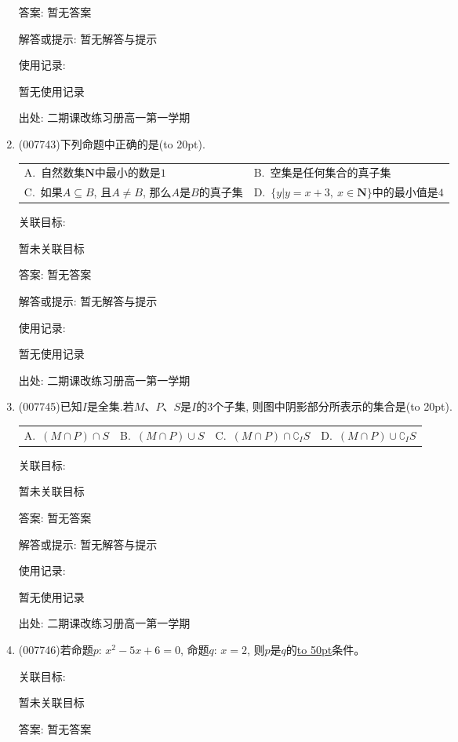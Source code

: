 \documentclass[10pt,a4paper]{article}
\newcommand{\blank}[1]{\underline{\hbox to #1pt{}}}
\newcommand{\bracket}[1]{(\hbox to #1pt{})}
\newcommand{\twoch}[4]{\par\begin{tabular}{p{.46\textwidth}p{.46\textwidth}}
A.~#1& B.~#2\\
C.~#3& D.~#4
\end{tabular}}
\newcommand{\fourch}[4]{\par\begin{tabular}{p{.23\textwidth}p{.23\textwidth}p{.23\textwidth}p{.23\textwidth}}
A.~#1 &B.~#2& C.~#3& D.~#4
\end{tabular}}
\begin{document}
\begin{enumerate}[1.]
答案: 暂无答案

解答或提示: 暂无解答与提示

使用记录:

暂无使用记录


出处: 二期课改练习册高一第一学期
\item { (007743)}下列命题中正确的是\bracket{20}.
\twoch{自然数集$\mathbf{N}$中最小的数是$1$}{空集是任何集合的真子集}{如果$A\subseteq B$, 且$A\ne B$, 那么$A$是$B$的真子集}{$\{y|y=x+3,\ x\in \mathbf{N}\}$中的最小值是$4$}


关联目标:

暂未关联目标

答案: 暂无答案

解答或提示: 暂无解答与提示

使用记录:

暂无使用记录


出处: 二期课改练习册高一第一学期
\item { (007745)}已知$I$是全集.若$M$、$P$、$S$是$I$的$3$个子集, 则图中阴影部分所表示的集合是\bracket{20}.
\begin{center}
\end{center}
\fourch{$(M\cap P)\cap S$}{$(M\cap P)\cup S$}{$(M\cap P)\cap \complement _IS$}{$(M\cap P)\cup \complement _IS$}


关联目标:

暂未关联目标

答案: 暂无答案

解答或提示: 暂无解答与提示

使用记录:

暂无使用记录


出处: 二期课改练习册高一第一学期
\item { (007746)}若命题$p$: $x^2-5x+6=0$, 命题$q$: $x=2$, 则$p$是$q$的\blank{50}条件。


关联目标:

暂未关联目标

答案: 暂无答案


\end{enumerate}
\end{document}

